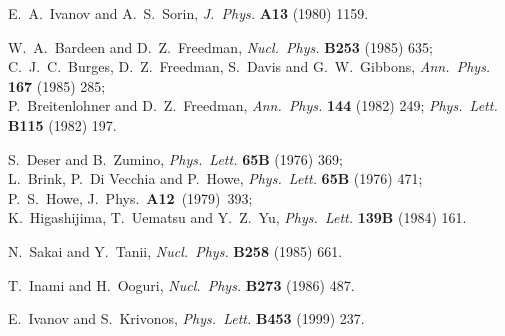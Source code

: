 \documentclass[a4paper,12pt]{article}
\begin{document}
\begin{thebibliography}{99}
     E.~A.~Ivanov and A.~S.~Sorin, {\sl J.~Phys.} {\bf A13} (1980) 1159.

     W.~A.~Bardeen and D.~Z.~Freedman, {\sl Nucl.~Phys.} {\bf B253} (1985) 
     635;\\
     C.~J.~C.~Burges, D.~Z.~Freedman, S.~Davis and G.~W.~Gibbons,
     {\sl Ann.~Phys.} {\bf 167} (1985) 285;\\
     P.~Breitenlohner and D.~Z.~Freedman, {\sl Ann.~Phys.} {\bf 144} (1982) 
     249; {\sl Phys.~Lett.} {\bf B115} (1982) 197.

     S.~Deser and B.~Zumino, {\sl Phys.~Lett.} {\bf 65B} (1976) 369;\\
     L.~Brink, P.~Di Vecchia and P.~Howe, {\sl Phys.~Lett.} {\bf 65B} 
     (1976) 471;\\
     P.~S.~Howe, J.~Phys.~{\bf A12}~(1979)~393;\\
     K.~Higashijima, T.~Uematsu and Y.~Z.~Yu, {\sl Phys.~Lett.} 
     {\bf 139B} (1984) 161.

     N.~Sakai and Y.~Tanii, {\sl Nucl.~Phys.} {\bf B258} (1985) 661.

     T.~Inami and H.~Ooguri, {\sl Nucl.~Phys.} {\bf B273} (1986) 487.

     E.~Ivanov and S.~Krivonos, {\sl Phys.~Lett.} {\bf B453} (1999)
     237.

\end{thebibliography}
\end{document}

